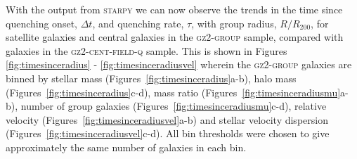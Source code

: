 \documentclass[useAMS,usenatbib]{mn2e}
\begin{document}
With the output from \textsc{starpy} we can now observe the trends in the time since quenching onset, $\Delta t$, and quenching rate, $\tau$, with group radius, $R/R_{200}$, for satellite galaxies and central galaxies in the \textsc{gz2-group} sample, compared with galaxies in the \textsc{gz2-cent-field-q} sample. This is shown in Figures \ref{fig:timesinceradius} - \ref{fig:timesinceradiusvel} wherein the \textsc{gz2-group} galaxies are binned by stellar mass (Figures~\ref{fig:timesinceradius}a-b), halo mass (Figures~\ref{fig:timesinceradius}c-d), mass ratio (Figures~\ref{fig:timesinceradiusmu}a-b), number of group galaxies (Figures~\ref{fig:timesinceradiusmu}c-d), relative velocity (Figures~\ref{fig:timesinceradiusvel}a-b) and stellar velocity dispersion (Figures~\ref{fig:timesinceradiusvel}c-d). All bin thresholds were chosen to give approximately the same number of galaxies in each bin. 
\end{document}
